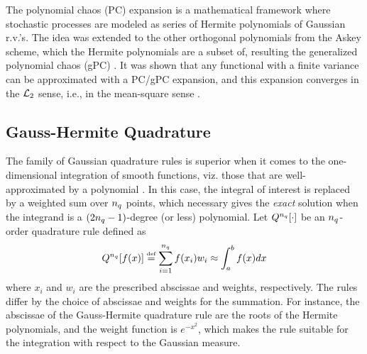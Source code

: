 The polynomial chaos (PC) expansion is a mathematical framework where stochastic processes are modeled as series of Hermite polynomials of Gaussian r.v.'s. The idea was extended to the other orthogonal polynomials from the Askey scheme, which the Hermite polynomials are a subset of, resulting the generalized polynomial chaos (gPC) \cite{xiu2002}. It was shown that any functional with a finite variance can be approximated with a PC/gPC expansion, and this expansion converges in the $\mathcal{L}_{2}$ sense, i.e., in the mean-square sense \cite{ghanem2003}.

\subsection{Gauss-Hermite Quadrature}
The family of Gaussian quadrature rules is superior when it comes to the one-dimensional integration of smooth functions, viz. those that are well-approximated by a polynomial \cite{press2007}. In this case, the integral of interest is replaced by a weighted sum over ${n_q}$ points, which necessary gives the \emph{exact} solution when the integrand is a $(2{n_q} - 1)$-degree (or less) polynomial. Let $Q^{{n_q}}[\cdot]$ be an ${n_q}$-order quadrature rule defined as
\[
  Q^{{n_q}}[f(x)] \stackrel{\text{\tiny def}}{=} \sum_{i = 1}^{{n_q}} f(x_i) w_i \approx \int_a^b f(x) dx
\]
where $x_i$ and $w_i$ are the prescribed abscissae and weights, respectively. The rules differ by the choice of abscissae and weights for the summation. For instance, the abscissae of the Gauss-Hermite quadrature rule are the roots of the Hermite polynomials, and the weight function is $e^{-x^2}$, which makes the rule suitable for the integration with respect to the Gaussian measure.
